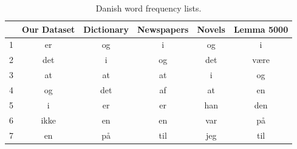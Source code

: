 \begin{table}[H]
	\centering
	\caption{Danish word frequency lists.}
	\begin{tabular}{lccccc}
		\hline
		& \multicolumn{1}{l}{Our Dataset} & \multicolumn{1}{l}{Dictionary\cite{sprogetdk}} & \multicolumn{1}{l}{Newspapers\cite{sprogetdk}} & \multicolumn{1}{l}{Novels\cite{sprogetdk}} & \multicolumn{1}{l}{Lemma 5000\cite{sprogetdk}} \\ \hline
		1  & er                              & og                                                              & i                                                               & og                                                          & i                                                               \\
		2  & det                             & i                                                               & og                                                              & det                                                         & være                                                            \\
		3  & at                              & at                                                              & at                                                              & i                                                           & og                                                              \\
		4  & og                              & det                                                             & af                                                              & at                                                          & en                                                              \\
		5  & i                               & er                                                              & er                                                              & han                                                         & den                                                             \\
		6  & ikke                            & en                                                              & en                                                              & var                                                         & på                                                              \\
		7  & en                              & på                                                              & til                                                             & jeg                                                         & til                                                             \\

\end{tabular}
\end{table}
